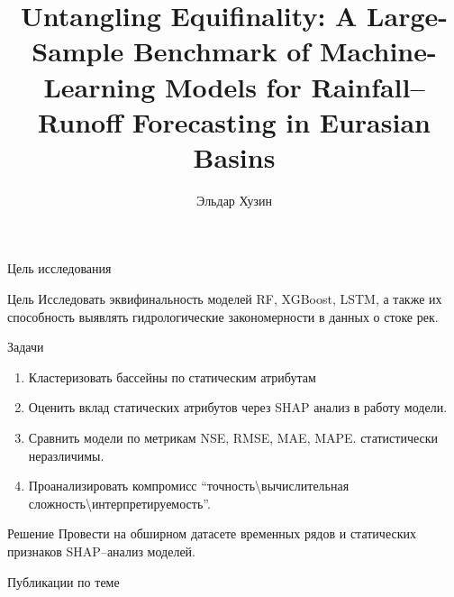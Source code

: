 \documentclass[xcolor=table]{beamer}
\title{Untangling Equifinality: A Large-Sample Benchmark of Machine-Learning Models for Rainfall–Runoff Forecasting in Eurasian Basins}
\author[Э.~Хузин]{Эльдар Хузин}
\institute{Московский физико-технический институт}
\date{\footnotesize
\par\smallskip\emph{Курс:} My first scientific paper
\par\smallskip\emph{Эксперт:} Д.~Абрамов
\par\smallskip\emph{Консультант:} D.\,D.~Dorin
\par\bigskip\small 2025}
\begin{document}
\begin{frame}[plain]
    \maketitle
\end{frame}
\begin{frame}{Цель исследования}
    \begin{block}{Цель}
        Исследовать эквифинальность моделей RF, XGBoost, LSTM, а также их способность выявлять гидрологические закономерности в данных о стоке рек.
    \end{block}

    \begin{block}{Задачи}
        \begin{enumerate}
            \item Кластеризовать бассейны по статическим атрибутам
            \item Оценить вклад статических атрибутов через SHAP анализ в работу модели.
            \item Сравнить модели по метрикам NSE, RMSE, MAE, MAPE.
                  статистически неразличимы.
            \item Проанализировать компромисс ``точность\textbackslash вычислительная
                  сложность\textbackslash интерпретируемость''.
        \end{enumerate}
    \end{block}

    \begin{block}{Решение}
        Провести на обширном датасете временных рядов и статических признаков SHAP--анализ моделей.
    \end{block}
\end{frame}

\begin{frame}{Публикации по теме}
    \nocite{
        bevenFutureDistributedModels1992a,
        kratzertLearningUniversalRegional2019
        underwoodMachineLearningRevealsEquifinality2023,
        janssenTacklingWaterTable2024,
    }
    \printbibliography[heading=None]
\end{frame}
\end{document}
